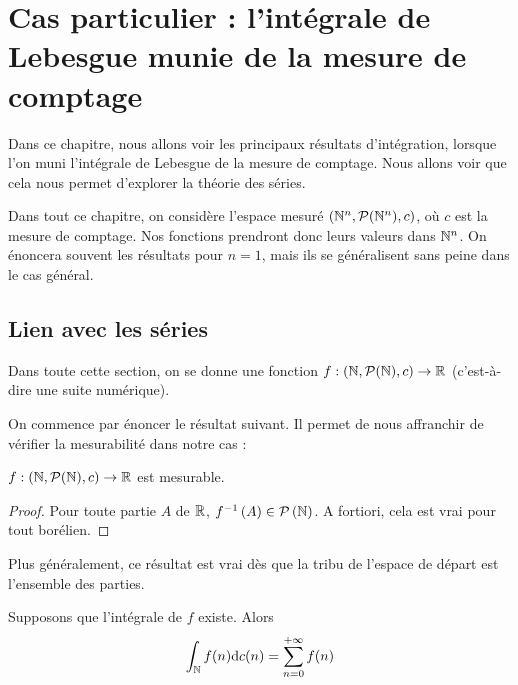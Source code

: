 \documentclass[../integ-proba.tex]{subfiles}
\begin{document}
    \chapter{Cas particulier : l'intégrale de Lebesgue munie de la mesure de comptage}
    \label{ch:series}

    Dans ce chapitre, nous allons voir les principaux résultats d'intégration, lorsque l'on muni l'intégrale de Lebesgue de la mesure de comptage.
    Nous allons voir que cela nous permet d'explorer la théorie des séries.

    Dans tout ce chapitre, on considère l'espace mesuré $\left(\mathbb{N}^n, \mathcal{P}(\mathbb{N}^n), c\right)$, où $c$ est la mesure de comptage.
    Nos fonctions prendront donc leurs valeurs dans $\mathbb{N}^n$.
    On énoncera souvent les résultats pour $n=1$, mais ils se généralisent sans peine dans le cas général.

    \section{Lien avec les séries}

    Dans toute cette section, on se donne une fonction $f:\left(\mathbb{N}, \mathcal{P}(\mathbb{N}), c\right) \rightarrow \mathbb{R}$ (c'est-à-dire une suite numérique).

    On commence par énoncer le résultat suivant.
    Il permet de nous affranchir de vérifier la mesurabilité dans notre cas :

    \begin{prop}
        $f:\left(\mathbb{N}, \mathcal{P}(\mathbb{N}), c\right) \rightarrow \mathbb{R}$ est mesurable.
    \end{prop}

    \begin{proof}
        Pour toute partie $A$ de $\mathbb{R}$, $f^{-1}\left(A\right) \in \mathcal{P}\left(\mathbb{N}\right)$.
        A fortiori, cela est vrai pour tout borélien.
    \end{proof}

    \begin{rem}
        Plus généralement, ce résultat est vrai dès que la tribu de l'espace de départ est l'ensemble des parties.
    \end{rem}

    \begin{thm}
        Supposons que l'intégrale de $f$ existe.
        Alors
        \begin{displaymath}
            \int_{\mathbb{N}} f(n)\textnormal{d}c(n) = \sum_{n=0}^{+\infty} f(n)
        \end{displaymath}
    \end{thm}
\end{document}
